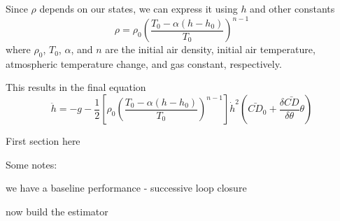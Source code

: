 \documentclass{article}
\begin{document}
  Since $\rho$ depends on our states, we can express it using $h$ and other constants
  \begin{equation}
    \rho = \rho_0 \left(   \frac{T_0 - \alpha\left( h-h_0 \right)}{T_0}   \right)^{n-1}
  \end{equation}
  where $\rho_0$, $T_0$, $\alpha$, and $n$ are the initial air density, initial air temperature, atmospheric temperature change, and gas constant, respectively.

  This results in the final equation
  \begin{equation}
    \ddot{h} = -g -\frac{1}{2} \left[\rho_0 \left(   \frac{T_0 - \alpha\left( h-h_0 \right)}{T_0}   \right)^{n-1}\right] \dot{h}^2 \left(\bar{CD}_0 + \frac{\delta\bar{CD}}{\delta\theta} \theta \right)
  \end{equation}

  



  First section here

  Some notes:

  we have a baseline performance - successive loop closure

  now build the estimator
\end{document}
